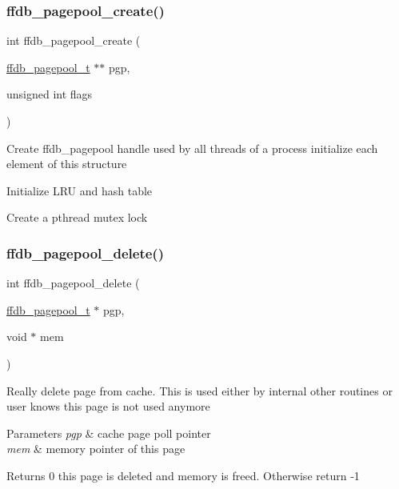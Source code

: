 \subsubsection{\texorpdfstring{ffdb\_pagepool\_create()}{ffdb\_pagepool\_create()}}
{\footnotesize\ttfamily int ffdb\+\_\+pagepool\+\_\+create (\begin{DoxyParamCaption}\item[{\mbox{\hyperlink{adat-devel_2other__libs_2filedb_2filehash_2ffdb__pagepool_8h_a73290f737b0e5f8be90a0fa96ddf6ab6}{ffdb\+\_\+pagepool\+\_\+t}} $\ast$$\ast$}]{pgp,  }\item[{unsigned int}]{flags }\end{DoxyParamCaption})}

Create ffdb\+\_\+pagepool handle used by all threads of a process initialize each element of this structure

Initialize L\+RU and hash table

Create a pthread mutex lock\mbox{\label{adat-devel_2other__libs_2filedb_2filehash_2ffdb__pagepool_8c_ad53e778be42420ab49a02b1d238b7533}} 
\subsubsection{\texorpdfstring{ffdb\_pagepool\_delete()}{ffdb\_pagepool\_delete()}}
{\footnotesize\ttfamily int ffdb\+\_\+pagepool\+\_\+delete (\begin{DoxyParamCaption}\item[{\mbox{\hyperlink{adat-devel_2other__libs_2filedb_2filehash_2ffdb__pagepool_8h_a73290f737b0e5f8be90a0fa96ddf6ab6}{ffdb\+\_\+pagepool\+\_\+t}} $\ast$}]{pgp,  }\item[{void $\ast$}]{mem }\end{DoxyParamCaption})}

Really delete page from cache. This is used either by internal other routines or user knows this page is not used anymore 
\begin{DoxyParams}{Parameters}
{\em pgp} & cache page poll pointer \\
\hline
{\em mem} & memory pointer of this page \\
\hline
\end{DoxyParams}
\begin{DoxyReturn}{Returns}
0 this page is deleted and memory is freed. Otherwise return -\/1 
\end{DoxyReturn}
\mbox{\label{adat-devel_2other__libs_2filedb_2filehash_2ffdb__pagepool_8c_ab7ffdd556982a46d76ab1237f2f6d4cf}} 
